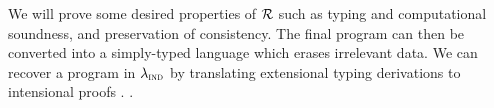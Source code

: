 We will prove some desired properties
of $\mathcal{R}$ \cite{Boulier2017-cm} such as typing and computational soundness, and
preservation of consistency. The final program can then be converted into a
simply-typed language which erases irrelevant data. We can recover a program in
$\lambda_{\textsc{ind}}$ by translating extensional typing derivations to intensional proofs
\cite{Winterhalter2019-zw}.
\cite{Winterhalter2019-zw}.
